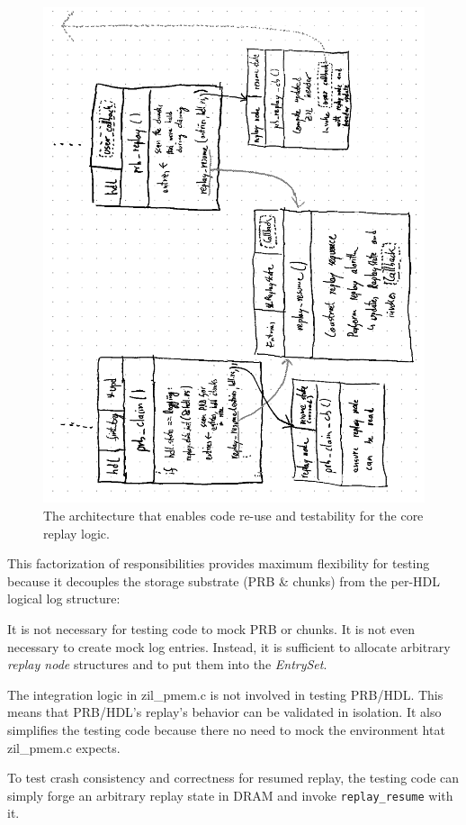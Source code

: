 \documentclass[12pt,a4paper,twoside]{book}
\begin{document}
\begin{figure}[H]
    \centering
    \includegraphics{fig/prb_replay_resume_architecture}
    \caption{The architecture that enables code re-use and testability for the core replay logic.}
    \label{fig:eval:prb_replay_resume_architecture}
\end{figure}

This factorization of responsibilities provides maximum flexibility for testing because it decouples the storage substrate (PRB \& chunks) from the per-HDL logical log structure:
\begin{description}[noitemsep,leftmargin=1.5cm,labelindent=1cm]
    \item[Independence of PRB \& Chunks]
        It is not necessary for testing code to mock PRB or chunks.
        It is not even necessary to create mock log entries.
        Instead, it is sufficient to allocate arbitrary \textit{replay node} structures and to put them into the \textit{EntrySet}.

    \item[Independence of zil\_pmem.c]
        The integration logic in zil\_pmem.c is not involved in testing PRB/HDL.
        This means that PRB/HDL's replay's behavior can be validated in isolation.
        It also simplifies the testing code because there no need to mock the environment htat zil\_pmem.c expects.

    \item[Crash Consistency Testing]
        To test crash consistency and correctness for resumed replay, the testing code can simply forge an arbitrary replay state in DRAM and invoke \lstinline{replay_resume} with it.
\end{description}
\end{document}

